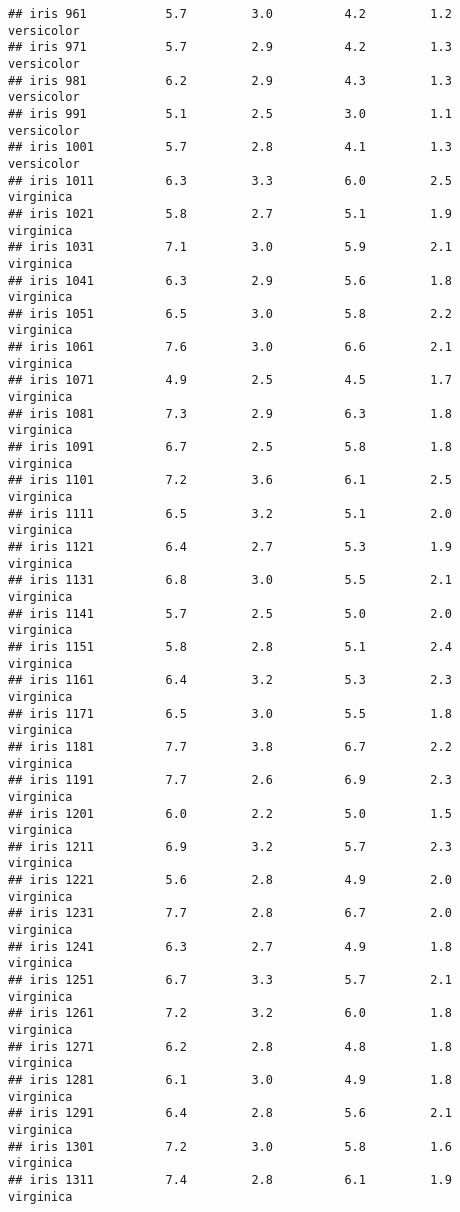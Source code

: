 \documentclass[
]{article}
\begin{document}
\begin{verbatim}
## iris 961           5.7         3.0          4.2         1.2 versicolor
## iris 971           5.7         2.9          4.2         1.3 versicolor
## iris 981           6.2         2.9          4.3         1.3 versicolor
## iris 991           5.1         2.5          3.0         1.1 versicolor
## iris 1001          5.7         2.8          4.1         1.3 versicolor
## iris 1011          6.3         3.3          6.0         2.5  virginica
## iris 1021          5.8         2.7          5.1         1.9  virginica
## iris 1031          7.1         3.0          5.9         2.1  virginica
## iris 1041          6.3         2.9          5.6         1.8  virginica
## iris 1051          6.5         3.0          5.8         2.2  virginica
## iris 1061          7.6         3.0          6.6         2.1  virginica
## iris 1071          4.9         2.5          4.5         1.7  virginica
## iris 1081          7.3         2.9          6.3         1.8  virginica
## iris 1091          6.7         2.5          5.8         1.8  virginica
## iris 1101          7.2         3.6          6.1         2.5  virginica
## iris 1111          6.5         3.2          5.1         2.0  virginica
## iris 1121          6.4         2.7          5.3         1.9  virginica
## iris 1131          6.8         3.0          5.5         2.1  virginica
## iris 1141          5.7         2.5          5.0         2.0  virginica
## iris 1151          5.8         2.8          5.1         2.4  virginica
## iris 1161          6.4         3.2          5.3         2.3  virginica
## iris 1171          6.5         3.0          5.5         1.8  virginica
## iris 1181          7.7         3.8          6.7         2.2  virginica
## iris 1191          7.7         2.6          6.9         2.3  virginica
## iris 1201          6.0         2.2          5.0         1.5  virginica
## iris 1211          6.9         3.2          5.7         2.3  virginica
## iris 1221          5.6         2.8          4.9         2.0  virginica
## iris 1231          7.7         2.8          6.7         2.0  virginica
## iris 1241          6.3         2.7          4.9         1.8  virginica
## iris 1251          6.7         3.3          5.7         2.1  virginica
## iris 1261          7.2         3.2          6.0         1.8  virginica
## iris 1271          6.2         2.8          4.8         1.8  virginica
## iris 1281          6.1         3.0          4.9         1.8  virginica
## iris 1291          6.4         2.8          5.6         2.1  virginica
## iris 1301          7.2         3.0          5.8         1.6  virginica
## iris 1311          7.4         2.8          6.1         1.9  virginica

\end{verbatim}
\end{document}
